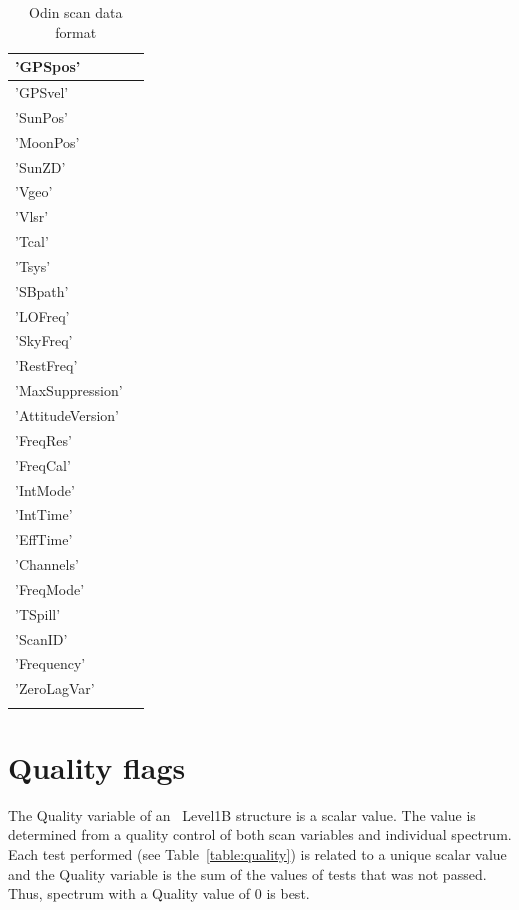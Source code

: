 \begin{longtable}{| p{} | p{} |}
     'GPSpos'          & \\ \hline
     'GPSvel'         & \\ \hline
     'SunPos'          & \\ \hline
     'MoonPos'        & \\ \hline
     'SunZD'           & \\ \hline
     'Vgeo'           & \\ \hline
     'Vlsr'            & \\ \hline
     'Tcal'          & \\ \hline
     'Tsys'           & \\ \hline
     'SBpath'          & \\ \hline
     'LOFreq'          & \\ \hline
     'SkyFreq'        & \\ \hline
     'RestFreq'      & \\ \hline
     'MaxSuppression' & \\ \hline
     'AttitudeVersion' & \\  \hline
     'FreqRes'        & \\ \hline
     'FreqCal'         & \\ \hline
     'IntMode'       & \\ \hline
     'IntTime'         & \\ \hline
     'EffTime'         & \\ \hline
     'Channels'       & \\ \hline
     'FreqMode'       & \\ \hline
     'TSpill'         & \\ \hline
     'ScanID'         & \\ \hline
     'Frequency'      & \\ \hline
     'ZeroLagVar'     & \\ \hline
\hline
\caption{ Odin scan data format}
\label{table:dataformat}
\end{longtable}



\section{Quality flags}

The Quality variable of an \smr\ Level1B structure is a scalar value.
The value is determined from a quality control
of both scan variables and individual spectrum.
Each test performed (see Table~\ref{table:quality}) is related to a unique scalar value
and the Quality variable is the sum of the values of tests 
that was not passed.  
Thus, spectrum with a Quality value of 0 is best.

